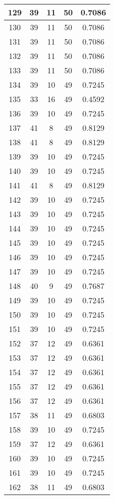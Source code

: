 \documentclass[letterpaper, 12pt]{article}
\begin{document}
\begin{longtable}{|c|c|c|c|c|}
\hline
129 & 39 & 11 & 50 & 0.7086 \\
\hline
130 & 39 & 11 & 50 & 0.7086 \\
\hline
131 & 39 & 11 & 50 & 0.7086 \\
\hline
132 & 39 & 11 & 50 & 0.7086 \\
\hline
133 & 39 & 11 & 50 & 0.7086 \\
\hline
134 & 39 & 10 & 49 & 0.7245 \\
\hline
135 & 33 & 16 & 49 & 0.4592 \\
\hline
136 & 39 & 10 & 49 & 0.7245 \\
\hline
137 & 41 & 8 & 49 & 0.8129 \\
\hline
138 & 41 & 8 & 49 & 0.8129 \\
\hline
139 & 39 & 10 & 49 & 0.7245 \\
\hline
140 & 39 & 10 & 49 & 0.7245 \\
\hline
141 & 41 & 8 & 49 & 0.8129 \\
\hline
142 & 39 & 10 & 49 & 0.7245 \\
\hline
143 & 39 & 10 & 49 & 0.7245 \\
\hline
144 & 39 & 10 & 49 & 0.7245 \\
\hline
145 & 39 & 10 & 49 & 0.7245 \\
\hline
146 & 39 & 10 & 49 & 0.7245 \\
\hline
147 & 39 & 10 & 49 & 0.7245 \\
\hline
148 & 40 & 9 & 49 & 0.7687 \\
\hline
149 & 39 & 10 & 49 & 0.7245 \\
\hline
150 & 39 & 10 & 49 & 0.7245 \\
\hline
151 & 39 & 10 & 49 & 0.7245 \\
\hline
152 & 37 & 12 & 49 & 0.6361 \\
\hline
153 & 37 & 12 & 49 & 0.6361 \\
\hline
154 & 37 & 12 & 49 & 0.6361 \\
\hline
155 & 37 & 12 & 49 & 0.6361 \\
\hline
156 & 37 & 12 & 49 & 0.6361 \\
\hline
157 & 38 & 11 & 49 & 0.6803 \\
\hline
158 & 39 & 10 & 49 & 0.7245 \\
\hline
159 & 37 & 12 & 49 & 0.6361 \\
\hline
160 & 39 & 10 & 49 & 0.7245 \\
\hline
161 & 39 & 10 & 49 & 0.7245 \\
\hline
162 & 38 & 11 & 49 & 0.6803 \\

\end{longtable}
\end{document}

